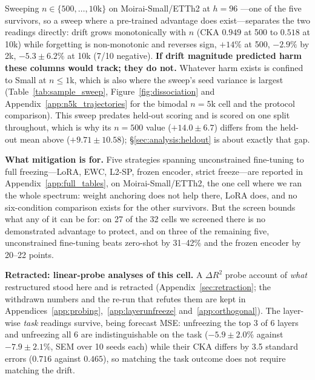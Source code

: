 Sweeping $n{\in}\{500,\ldots,10\mathrm{k}\}$ on Moirai-Small/ETTh2 at $h{=}96$
---one of the five survivors, so a sweep where a pre-trained advantage does
exist---separates the two readings directly: drift grows monotonically with $n$
(CKA $0.949$ at 500 to $0.518$ at 10k) while forgetting is non-monotonic and
reverses sign, $+14\%$ at 500, $-2.9\%$ by 2k, $-5.3{\pm}6.2\%$ at 10k (7/10
negative). \textbf{If drift magnitude predicted harm these columns would track;
they do not.}  Whatever harm exists is confined to Small at $n{\leq}1$k, which
is also where the sweep's seed variance is largest
(Table~\ref{tab:sample_sweep}, Figure~\ref{fig:dissociation} and
Appendix~\ref{app:n5k_trajectories} for the bimodal $n{=}5$k cell and the
protocol comparison).  This sweep predates held-out scoring and is scored on one
split throughout, which is why its $n{=}500$ value ($+14.0{\pm}6.7$) differs
from the held-out mean above ($+9.71{\pm}10.58$);
\S\ref{sec:analysis:heldout} is about exactly that gap.

\textbf{What mitigation is for.} Five strategies spanning unconstrained
fine-tuning to full freezing---LoRA, EWC, L2-SP, frozen encoder, strict
freeze---are reported in Appendix~\ref{app:full_tables}, on
Moirai-Small/ETTh2, the one cell where we ran the whole spectrum: weight
anchoring does not help there, LoRA does, and no six-condition comparison
exists for the other survivors.  But the screen bounds what any of it can be
for: on 27 of the 32 cells we screened there is no demonstrated advantage to
protect, and on three of the remaining five, unconstrained fine-tuning beats
zero-shot by 31--42\% and the frozen encoder by 20--22 points.

\textbf{Retracted: linear-probe analyses of this cell.} A $\Delta R^2$ probe
account of \emph{what} restructured stood here and is retracted
(Appendix~\ref{sec:retraction}; the withdrawn numbers and the re-run that
refutes them are kept in Appendices~\ref{app:probing},~\ref{app:layerunfreeze}
and~\ref{app:orthogonal}).  The
layer-wise \emph{task} readings survive, being forecast MSE: unfreezing the top
3 of 6 layers and unfreezing all 6 are indistinguishable on the task
($-5.9{\pm}2.0$\% against $-7.9{\pm}2.1$\%, SEM over 10 seeds each) while their
CKA differs by 3.5 standard errors ($0.716$ against $0.465$), so matching the
task outcome does not require matching the drift.
